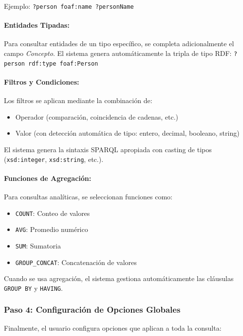 \documentclass{article}
\begin{document}
Ejemplo: \texttt{?person foaf:name ?personName}

\paragraph{Entidades Tipadas:}
Para consultar entidades de un tipo específico, se completa adicionalmente el campo \textit{Concepto}. El sistema genera automáticamente la tripla de tipo RDF: \texttt{?person rdf:type foaf:Person}

\paragraph{Filtros y Condiciones:}
Los filtros se aplican mediante la combinación de:
\begin{itemize}
    \item Operador (comparación, coincidencia de cadenas, etc.)
    \item Valor (con detección automática de tipo: entero, decimal, booleano, string)
\end{itemize}

El sistema genera la sintaxis SPARQL apropiada con casting de tipos (\texttt{xsd:integer}, \texttt{xsd:string}, etc.).

\paragraph{Funciones de Agregación:}
Para consultas analíticas, se seleccionan funciones como:
\begin{itemize}
    \item \texttt{COUNT}: Conteo de valores
    \item \texttt{AVG}: Promedio numérico
    \item \texttt{SUM}: Sumatoria
    \item \texttt{GROUP\_CONCAT}: Concatenación de valores
\end{itemize}

Cuando se usa agregación, el sistema gestiona automáticamente las cláusulas \texttt{GROUP BY} y \texttt{HAVING}.

\subsubsection{Paso 4: Configuración de Opciones Globales}
\label{subsubsec:global-options}

Finalmente, el usuario configura opciones que aplican a toda la consulta:
\end{document}
